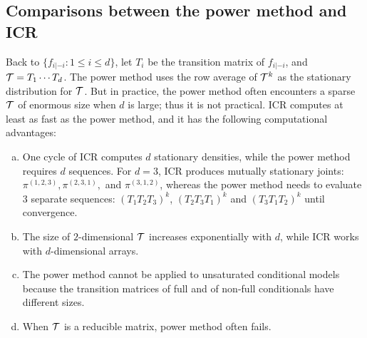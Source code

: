\documentclass[12pt,a4paper]{article}
\begin{document}
\subsection{Comparisons between the power method and ICR}\label{sec:4-3}
Back to $\{f_{i|-i}: 1\le i \le d\}$, let $T_i$ be the transition matrix of $f_{i|-i}$, and ${\cal T}=T_1\cdots T_d$.
The power method uses the row average of ${\cal T}^k$ as the stationary distribution for ${\cal T}$.
But in practice, the power method often encounters a sparse ${\cal T}$ of enormous size
when $d$ is large; thus it is not  practical.  ICR computes at least as fast as the power method, and it has the following computational advantages:
\begin{enumerate}[(a)]
\item One cycle of ICR computes $d$ stationary densities, while the power method requires $d$  sequences.  For $d=3$, ICR produces mutually stationary joints: $\pi^{(1,2,3)},\pi^{(2,3,1)},$ and  $\pi^{(3,1,2)}$, whereas the power method needs to  evaluate $3$ separate sequences: $(T_1T_2T_3)^k$, $(T_2T_3T_1)^k$ and $(T_3T_1T_2)^k$ until convergence.
\item The size of $2$-dimensional ${\cal T}$ increases exponentially with $d$, while ICR works with $d$-dimensional arrays.
\item The power method cannot be applied to  unsaturated conditional models because the transition matrices of full and of non-full conditionals have different sizes.
\item When  ${\cal T}$ is a reducible matrix, power method often fails.
\end{enumerate}
\end{document}
